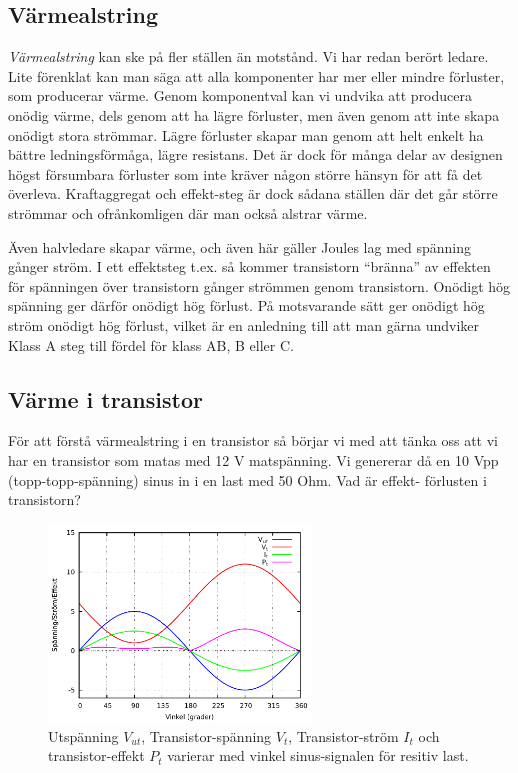 \subsection{Värmealstring}

\emph{Värmealstring} kan ske på fler ställen än motstånd. Vi har redan berört
ledare. Lite förenklat kan man säga att alla komponenter har mer eller mindre
förluster, som producerar värme. Genom komponentval kan vi undvika att
producera onödig värme, dels genom att ha lägre förluster, men även genom att
inte skapa onödigt stora strömmar. Lägre förluster skapar man genom att helt
enkelt ha bättre ledningsförmåga, lägre resistans. Det är dock för många
delar av designen högst försumbara förluster som inte kräver någon större
hänsyn för att få det överleva. Kraftaggregat och effekt-steg är dock sådana
ställen där det går större strömmar och ofrånkomligen där man också alstrar
värme.

Även halvledare skapar värme, och även här gäller Joules lag med spänning
gånger ström. I ett effektsteg t.ex. så kommer transistorn ``bränna'' av
effekten för spänningen över transistorn gånger strömmen genom transistorn.
Onödigt hög spänning ger därför onödigt hög förlust. På motsvarande sätt ger
onödigt hög ström onödigt hög förlust, vilket är en anledning till att man
gärna undviker Klass A steg till fördel för klass AB, B eller C.

\subsection{Värme i transistor}

För att förstå värmealstring i en transistor så börjar vi med att tänka oss
att vi har en transistor som matas med 12 V matspänning. Vi genererar då en
10 Vpp (topp-topp-spänning) sinus in i en last med 50 Ohm. Vad är effekt-
förlusten i transistorn?

\begin{figure}[h]
\begin{center}
\includegraphics[width=7cm]{power1}
\caption{Utspänning $V_{ut}$, Transistor-spänning $V_t$, Transistor-ström $I_t$ och transistor-effekt $P_t$ varierar med vinkel sinus-signalen för resitiv last.}
\label{fig:power1}
\end{center}
\end{figure}

